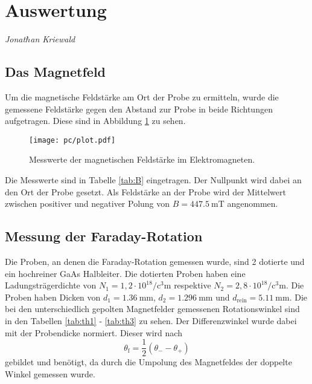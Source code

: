 \section{Auswertung}
\label{sec:Auswertung}
{\footnotesize \textit{Jonat$\hbar$an Kriewald}}

\subsection{Das Magnetfeld}
Um die magnetische Feldstärke am Ort der Probe zu ermitteln, wurde die gemessene Feldstärke gegen den Abstand zur Probe in beide Richtungen aufgetragen.
Diese sind in Abbildung \ref{fig:plot} zu sehen.
\begin{figure}
  \centering
  \texttt{[image: pc/plot.pdf]}
  \caption{Messwerte der magnetischen Feldstärke im Elektromagneten.}
  \label{fig:plot}
\end{figure}
Die Messwerte sind in Tabelle \ref{tab:B} eingetragen.
Der Nullpunkt wird dabei an den Ort der Probe gesetzt.
Als Feldstärke an der Probe wird der Mittelwert zwischen positiver und negativer Polung von $B = \SI{447.5}{\milli\tesla}$ angenommen.

\subsection{Messung der Faraday-Rotation}
Die Proben, an denen die Faraday-Rotation gemessen wurde, sind 2 dotierte und ein hochreiner GaAs Halbleiter.
Die dotierten Proben haben eine Ladungsträgerdichte von $N_1 =  1{,}2 \cdot 10^{18} \si{\per\cubic\centi\meter}$ respektive $N_2 = 2{,}8 \cdot 10^{18} \si{\per\cubic\centi\meter}$.
Die Proben haben Dicken von $d_1 = \SI{1.36}{\milli\meter}$, $d_2 = \SI{1.296}{\milli\meter}$ und $d_\text{rein} = \SI{5.11}{\milli\meter}$.
Die bei den unterschiedlich gepolten Magnetfelder gemessenen Rotationswinkel sind in den Tabellen \ref{tab:th1} - \ref{tab:th3} zu sehen.
Der Differenzwinkel wurde dabei mit der Probendicke normiert.
Dieser wird nach 
\begin{equation}
	\theta_\text{f} = \frac{1}{2}(\theta_- -\theta_+)
\end{equation}
gebildet und benötigt, da durch die Umpolung des Magnetfeldes der doppelte Winkel gemessen wurde.




